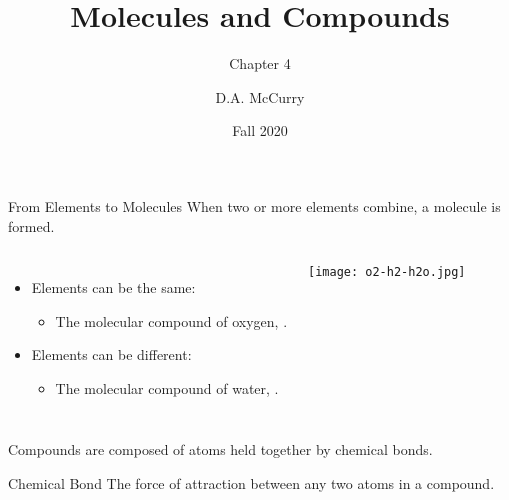 \documentclass[notes=onlyslideswithnotes,notes=hide]{beamer}
\title{Molecules and Compounds}
\subtitle{Chapter 4}
\institute[CHEM115 Bloomsburg University]{CHEM115 --- Chemistry for the Sciences I \\ Bloomsburg University}
\author{D.A. McCurry}
\date{Fall 2020}
\begin{document}
\maketitle
{}


\begin{frame}{From Elements to Molecules}
	When two or more elements combine, a molecule is formed.
	\begin{columns}
		\begin{itemize}
			\item Elements can be the same:
				\begin{itemize}
					\item The molecular compound of oxygen,
						.
				\end{itemize}
			\item Elements can be different:
				\begin{itemize}
					\item The molecular compound of water,
						.
				\end{itemize}
		\end{itemize}
		\centering
		\texttt{[image: o2-h2-h2o.jpg]}
	\end{columns}

	\bigskip

	Compounds are composed of atoms held together by \alert{chemical bonds}.

	\pause

	\begin{block}{Chemical Bond}
		The force of attraction between any two atoms in a compound.
	\end{block}
\end{frame}
\end{document}
